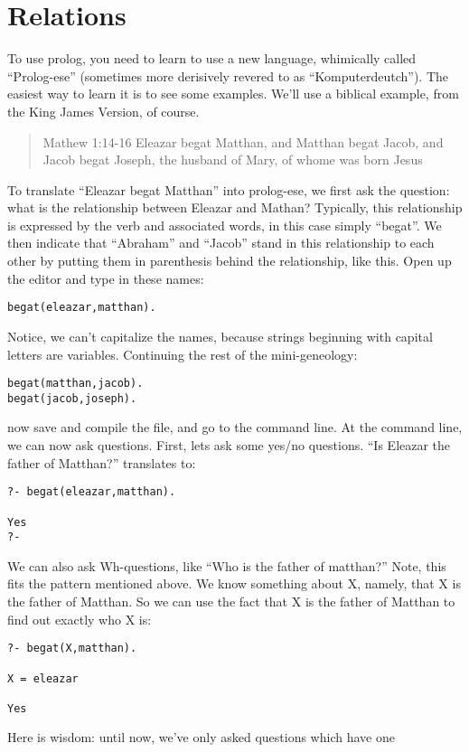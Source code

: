 \documentclass{book}[9pt]
\begin{document}
\section{Relations}

To use prolog, you need to learn to use a new language, whimically
called ``Prolog-ese'' (sometimes more derisively revered to as
``Komputerdeutch'').  The easiest way to learn it is to see some
examples.  We'll use a biblical example, from the King James Version,
of course.
\begin{quote}
Mathew 1:14-16 Eleazar begat Matthan, and Matthan begat Jacob, and
Jacob begat Joseph, the husband of Mary, of whome was born Jesus
\end{quote}
To translate ``Eleazar begat Matthan'' into prolog-ese, we first ask
the question: what is the relationship between Eleazar and Mathan?
Typically, this relationship is expressed by the verb and associated
words, in this case simply ``begat''.  We then indicate that
``Abraham'' and ``Jacob'' stand in this relationship to each other by
putting them in parenthesis behind the relationship, like this.  Open
up the editor and type in these names:
\begin{verbatim}
begat(eleazar,matthan).
\end{verbatim}
\noindent Notice, we can't capitalize the names, because strings
beginning with capital letters are variables.  Continuing the rest of
the mini-geneology:
\begin{verbatim}
begat(matthan,jacob).
begat(jacob,joseph).
\end{verbatim}
\noindent now save and compile the file, and go to the command line.
At the command line, we can now ask questions.  First, lets ask some
yes/no questions.  ``Is Eleazar the father of Matthan?'' translates
to:
\begin{verbatim}
?- begat(eleazar,matthan).

Yes
?- 
\end{verbatim}
\noindent We can also ask Wh-questions, like ``Who is the father of
matthan?''  Note, this fits the pattern mentioned above.  We know
something about X, namely, that X is the father of Matthan.  So we can
use the fact that X is the father of Matthan to find out exactly who X
is:
\begin{verbatim}
?- begat(X,matthan).

X = eleazar

Yes
\end{verbatim}
Here is wisdom: until now, we've only asked questions which have one
\end{document}
